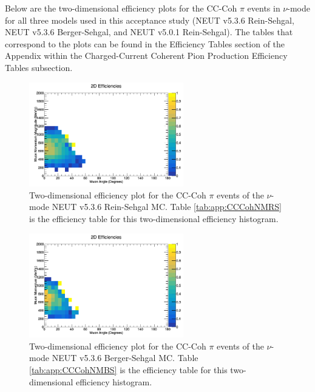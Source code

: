 \documentclass[11pt]{article}
\begin{document}
Below are the two-dimensional efficiency plots for the CC-Coh $\pi$ events in $\nu$-mode for all three models used in this acceptance study (NEUT v5.3.6 Rein-Sehgal, NEUT v5.3.6 Berger-Sehgal, and NEUT v5.0.1 Rein-Sehgal). The tables that correspond to the plots can be found in the Efficiency Tables section of the Appendix within the Charged-Current Coherent Pion Production Efficiency Tables subsection.

\begin{figure}[H]
\centering
\includegraphics[width=0.6\textwidth]{CCCohPlots/2DEffNMRS.png}
\caption{Two-dimensional efficiency plot for the CC-Coh $\pi$ events of the $\nu$-mode NEUT v5.3.6 Rein-Sehgal MC. Table \ref*{tab:app:CCCohNMRS} is the efficiency table for this two-dimensional efficiency histogram.}
\label{fig:TwoDEfficiencyCCCohNMRS}
\end{figure}

\begin{figure}[H]
\centering
\includegraphics[width=0.6\textwidth]{CCCohPlots/2DEffNMBS.png}
\caption{Two-dimensional efficiency plot for the CC-Coh $\pi$ events of the $\nu$-mode NEUT v5.3.6 Berger-Sehgal MC. Table \ref*{tab:app:CCCohNMBS} is the efficiency table for this two-dimensional efficiency histogram.}
\label{fig:TwoDEfficiencyCCCohNMBS}
\end{figure}
\end{document}
